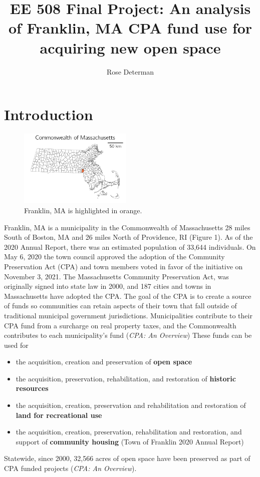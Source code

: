 \documentclass[12pt, stu, floatsintext,table]{apa7}
\title{EE 508 Final Project: An analysis of Franklin, MA CPA fund use for acquiring new open space}
\author{Rose Determan}
\affiliation{Boston University}
\begin{document}
\maketitle
\section{Introduction}
\begin{figure}
  \begin{center}
    \includegraphics[width=0.48\textwidth]{figures/state.png}
  \end{center}
  \caption{Franklin, MA is highlighted in orange.}
\end{figure}

Franklin, MA is a municipality in the Commonwealth of Massachusetts 28 miles South of Boston, MA and 26 miles North of Providence, RI (Figure 1). As of the 2020 Annual Report, there was an estimated population of 33,644 individuals. 
On May 6, 2020 the town council approved the adoption of the Community Preservation Act (CPA) and town members voted in favor of the initiative on November 3, 2021. The Massachusetts Community Preservation Act, was originally signed into state law in 2000, and 187 cities and towns in Massachusetts have adopted the CPA. The goal of the CPA is to create a source of funds so communities can retain aspects of their town that fall outside of traditional municipal government jurisdictions. Municipalities contribute to their CPA fund from a surcharge on real property taxes, and the Commonwealth contributes to each municipality's fund (\emph{CPA: An Overview}) These funds can be used for
\begin{itemize}
  \setlength\itemsep{0.0em}
  \item the acquisition, creation and preservation of \textbf{open space}
  \item the acquisition, preservation, rehabilitation, and restoration of \textbf{historic resources}
  \item the acquisition, creation, preservation and rehabilitation and restoration of \textbf{land for recreational use}
  \item the acquisition, creation, preservation, rehabilitation and restoration, and support of \textbf{community housing} (Town of Franklin 2020 Annual Report)
\end{itemize}
Statewide, since 2000, 32,566 acres of open space have been preserved as part of CPA funded projects (\emph{CPA: An Overview}).    
\end{document}
